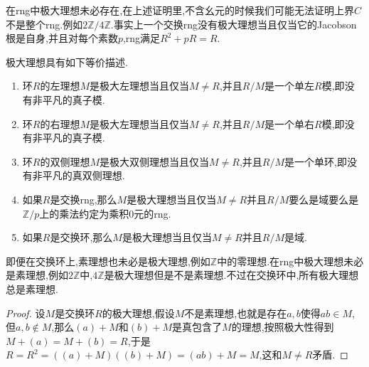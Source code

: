 在rng中极大理想未必存在,在上述证明里,不含幺元的时候我们可能无法证明上界$C$不是整个rng.例如$2\mathbb{Z}/4\mathbb{Z}$.事实上一个交换rng没有极大理想当且仅当它的Jacobson根是自身,并且对每个素数$p$,rng满足$R^2+pR=R$.

极大理想具有如下等价描述.
\begin{enumerate}
	\item 环$R$的左理想$M$是极大左理想当且仅当$M\not=R$,并且$R/M$是一个单左$R$模,即没有非平凡的真子模.
	\item 环$R$的右理想$M$是极大左理想当且仅当$M\not=R$,并且$R/M$是一个单右$R$模,即没有非平凡的真子模.
	\item 环$R$的双侧理想$M$是极大双侧理想当且仅当$M\not=R$,并且$R/M$是一个单环,即没有非平凡的真双侧理想.
	\item 如果$R$是交换rng,那么$M$是极大理想当且仅当$M\not=R$并且$R/M$要么是域要么是$\mathbb{Z}/p$上的乘法约定为乘积0元的rng.
	\item 如果$R$是交换环,那么$M$是极大理想当且仅当$M\not=R$并且$R/M$是域.
\end{enumerate}

即便在交换环上,素理想也未必是极大理想,例如$\mathbb{Z}$中的零理想.在rng中极大理想未必是素理想,例如$2\mathbb{Z}$中,$4\mathbb{Z}$是极大理想但是不是素理想.不过在交换环中,所有极大理想总是素理想.
\begin{proof}
	
	设$M$是交换环$R$的极大理想,假设$M$不是素理想,也就是存在$a,b$使得$ab\in M$,但$a,b\not\in M$,那么$(a)+M$和$(b)+M$是真包含了$M$的理想,按照极大性得到$M+(a)=M+(b)=R$,于是$R=R^2=((a)+M)((b)+M)=(ab)+M=M$,这和$M\not=R$矛盾.
	
\end{proof}

